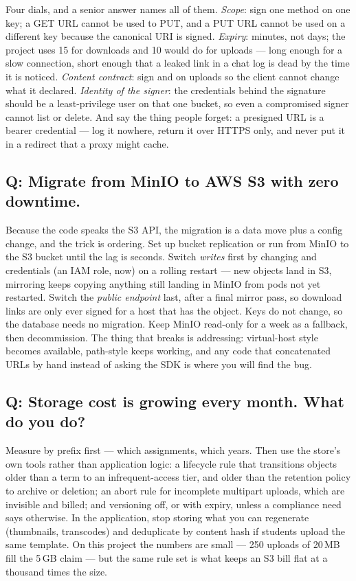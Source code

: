 Four dials, and a senior answer names all of them. \emph{Scope}: sign
one method on one key; a GET URL cannot be used to PUT, and a PUT URL
cannot be used on a different key because the canonical URI is signed.
\emph{Expiry}: minutes, not days; the project uses 15 for downloads and
10 would do for uploads --- long enough for a slow connection, short
enough that a leaked link in a chat log is dead by the time it is
noticed. \emph{Content contract}: sign  and
 on uploads so the client cannot change what it
declared. \emph{Identity of the signer}: the credentials behind the
signature should be a least-privilege user on that one bucket, so even a
compromised signer cannot list or delete. And say the thing people
forget: a presigned URL is a bearer credential --- log it nowhere,
return it over HTTPS only, and never put it in a redirect that a proxy
might cache.

\subsection*{Q: Migrate from MinIO to AWS S3 with zero downtime.}

Because the code speaks the S3 API, the migration is a data move plus a
config change, and the trick is ordering. Set up bucket replication or
run  from MinIO to the S3 bucket until the lag
is seconds. Switch \emph{writes} first by changing
 and credentials (an IAM role, now) on a rolling
restart --- new objects land in S3, mirroring keeps copying anything
still landing in MinIO from pods not yet restarted. Switch the
\emph{public endpoint} last, after a final mirror pass, so download
links are only ever signed for a host that has the object. Keys do not
change, so the database needs no migration. Keep MinIO read-only for a
week as a fallback, then decommission. The thing that breaks is
addressing: virtual-host style becomes available, path-style keeps
working, and any code that concatenated URLs by hand instead of asking
the SDK is where you will find the bug.

\subsection*{Q: Storage cost is growing every month. What do you do?}

Measure by prefix first --- which assignments, which years. Then use the
store's own tools rather than application logic: a lifecycle rule that
transitions objects older than a term to an infrequent-access tier, and
older than the retention policy to archive or deletion; an abort rule
for incomplete multipart uploads, which are invisible and billed; and
versioning off, or with expiry, unless a compliance need says otherwise.
In the application, stop storing what you can regenerate (thumbnails,
transcodes) and deduplicate by content hash if students upload the same
template. On this project the numbers are small --- 250 uploads of
20\,MB fill the 5\,GB claim --- but the same rule set is what keeps an
S3 bill flat at a thousand times the size.

